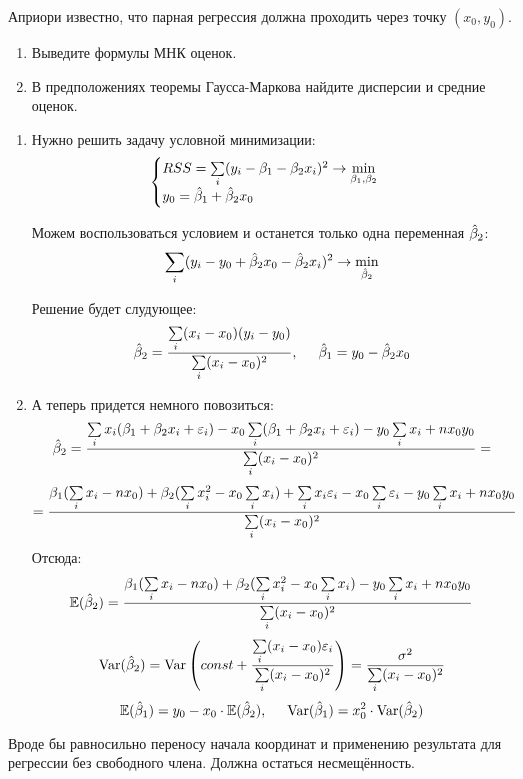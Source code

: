\begin{problem}
Априори известно, что парная регрессия должна проходить через точку $(x_{0},y_{0})$.
\begin{enumerate}
\item Выведите формулы МНК оценок.
\item В предположениях теоремы Гаусса-Маркова найдите дисперсии и средние оценок.
\end{enumerate}


\begin{sol}
\begin{enumerate}
\item Нужно решить задачу условной минимизации:
\[
\begin{cases}
RSS = \sum\limits_i(y_i-\beta_1-\beta_2x_i)^2 \rightarrow \min\limits_{\beta_1, \beta_2} \\
y_0 = \hat{\beta}_1 + \hat{\beta}_2x_0
\end{cases}
\]

Можем воспользоваться условием и останется только одна переменная $\hat{\beta}_2$:
\[
\sum\limits_i(y_i-y_0+\hat{\beta}_2x_0-\hat{\beta}_2x_i)^2 \rightarrow \min\limits_{\hat{\beta}_2}
\]

Решение будет слудующее:
\[
\hat{\beta}_2 = \frac{\sum\limits_i(x_i-x_0)(y_i-y_0)}{\sum\limits_i(x_i-x_0)^2}, \hspace{5mm} \hat{\beta}_1 = y_0-\hat{\beta}_2x_0
\]

\item А теперь придется немного повозиться:
\[
\hat{\beta}_2 = \frac{\sum\limits_ix_i(\beta_1 + \beta_2x_i+\varepsilon_i) - x_0\sum\limits_i(\beta_1 + \beta_2x_i+\varepsilon_i) - y_0\sum\limits_ix_i + nx_0y_0}{\sum\limits_i(x_i-x_0)^2} =
\]
\[
= \frac{\beta_1(\sum\limits_ix_i-nx_0)+\beta_2(\sum\limits_ix_i^2-x_0\sum\limits_ix_i) + \sum\limits_ix_i\varepsilon_i - x_0\sum\limits_i\varepsilon_i -y_0\sum\limits_ix_i + nx_0y_0}{\sum\limits_i(x_i-x_0)^2}
\]
Отсюда:
\[
\mathbb{E}(\hat{\beta}_2) = \frac{\beta_1(\sum\limits_ix_i-nx_0)+\beta_2(\sum\limits_ix_i^2-x_0\sum\limits_ix_i)-y_0\sum\limits_ix_i + nx_0y_0}{\sum\limits_i(x_i-x_0)^2}
\]
\[
  \operatorname{Var}(\hat{\beta}_2) = \operatorname{Var}\left(const + \frac{\sum\limits_i(x_i-x_0)\varepsilon_i}{\sum\limits_i(x_i-x_0)^2}\right) = \frac{\sigma^2}{\sum\limits_i(x_i-x_0)^2}
\]
\[
\mathbb{E}(\hat{\beta}_1) = y_0 - x_0\cdot \mathbb{E}(\hat{\beta}_2), \hspace{5mm} \operatorname{Var}(\hat{\beta}_1) = x_0^2\cdot \operatorname{Var}(\hat{\beta}_2)
\]

\end{enumerate}
Вроде бы равносильно переносу начала координат и применению результата для регрессии без свободного члена. Должна остаться несмещённость.

\end{sol}
\end{problem}





